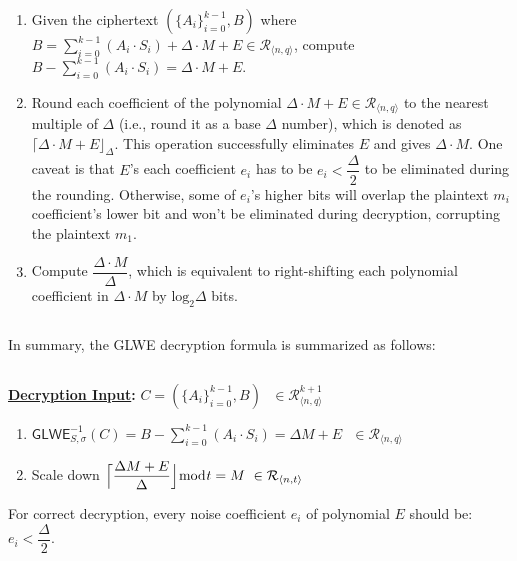 \begin{enumerate}
\item Given the ciphertext $(\{A_i\}_{i=0}^{k-1}, B)$ where $B = \sum\limits_{i=0}^{k-1}{(A_i \cdot S_i)} + \Delta \cdot M + E \in \mathcal{R}_{\langle n,q \rangle}$, compute $B - \sum\limits_{i=0}^{k-1}{(A_i \cdot S_i)} = \Delta \cdot M + E$. 
\item Round each coefficient of the polynomial $\Delta \cdot M + E \in \mathcal{R}_{\langle n,q \rangle}$ to the nearest multiple of $\Delta$ (i.e., round it as a base $\Delta$ number), which is denoted as $\lceil \Delta \cdot M + E \rfloor_{\Delta}$. This operation successfully eliminates $E$ and gives $\Delta \cdot M$. One caveat is that $E$'s each coefficient $e_i$ has to be $e_i < \dfrac{\Delta}{2}$ to be eliminated during the rounding. Otherwise, some of $e_i$'s higher bits will overlap the plaintext $m_i$ coefficient's lower bit and won't be eliminated during decryption, corrupting the plaintext $m_1$.
\item Compute $\dfrac{\Delta \cdot M} {\Delta}$, which is equivalent to right-shifting each polynomial coefficient in $\Delta \cdot M$ by $\text{log}_2 \Delta$ bits. 
\end{enumerate}

$ $

In summary, the GLWE decryption formula is summarized as follows:

$ $

\begin{tcolorbox}[title={\textbf{\tboxlabel{\ref*{subsec:glwe-dec}} GLWE Decryption}}]
\textbf{\underline{Decryption Input}:} $C = (\{A_i\}_{i=0}^{k-1}, B) \text{ } \in \mathcal{R}_{\langle n,q \rangle}^{k + 1}$

\begin{enumerate}
\item $\textsf{GLWE}^{-1}_{S,\sigma}(C) = B - \sum\limits_{i=0}^{k-1}{(A_i \cdot S_i)} = \Delta  M + E \text{ } \in \mathcal{R}_{\langle n,q \rangle}$

\item Scale down 
$\Bigl\lceil \dfrac{ \Delta  M + E }{\Delta}\Bigl\rfloor \bmod t = M \text{ } \in \mathcal{R}_{\langle n, t \rangle}$

\end{enumerate}

For correct decryption, every noise coefficient $e_i$ of polynomial $E$ should be: $e_i < \dfrac{\Delta}{2}$.

\end{tcolorbox}


